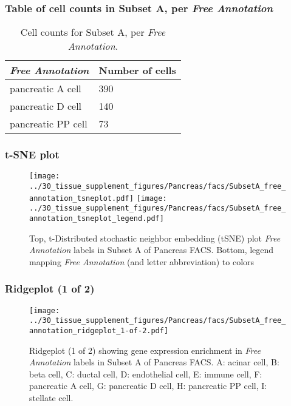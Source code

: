 \subsubsection{Table of cell counts in Subset A, per \emph{Free Annotation}}\begin{table}[h]
\centering
\label{my-label}
\begin{tabular}{@{}ll@{}}
\toprule

\emph{Free Annotation}& Number of cells \\ \midrule
pancreatic A cell & 390 \\

pancreatic D cell & 140 \\

pancreatic PP cell & 73 \\
\bottomrule
\end{tabular}
\caption{Cell counts for Subset A, per \emph{Free Annotation}.}
\end{table}

\clearpage
\subsubsection{t-SNE plot}
\begin{figure}[h]
\centering
\texttt{[image: ../30\_tissue\_supplement\_figures/Pancreas/facs/SubsetA\_free\_annotation\_tsneplot.pdf]}
\texttt{[image: ../30\_tissue\_supplement\_figures/Pancreas/facs/SubsetA\_free\_annotation\_tsneplot\_legend.pdf]}
\caption{Top, t-Distributed stochastic neighbor embedding (tSNE) plot  \emph{Free Annotation} labels in Subset A of Pancreas FACS. Bottom, legend mapping \emph{Free Annotation} (and letter abbreviation) to colors}
\end{figure}


\clearpage

\subsubsection{Ridgeplot (1 of 2)}
\begin{figure}[h]
\centering
\texttt{[image: ../30\_tissue\_supplement\_figures/Pancreas/facs/SubsetA\_free\_annotation\_ridgeplot\_1-of-2.pdf]}

\caption{ Ridgeplot (1 of 2)  showing gene expression enrichment in \emph{Free Annotation} labels in Subset A of Pancreas FACS. A: acinar cell, B: beta cell, C: ductal cell, D: endothelial cell, E: immune cell, F: pancreatic A cell, G: pancreatic D cell, H: pancreatic PP cell, I: stellate cell.}
\end{figure}


